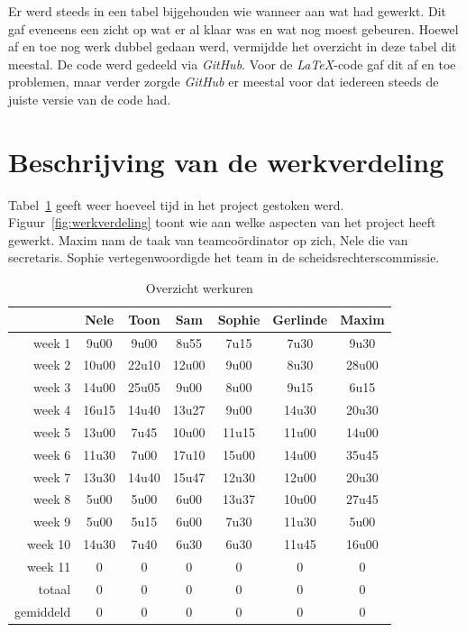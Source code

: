 \documentclass[eind]{penoverslag}
\begin{document}
Er werd steeds in een tabel bijgehouden wie wanneer aan wat had gewerkt. Dit gaf eveneens een zicht op wat er al klaar was en wat nog moest gebeuren. Hoewel af en toe nog werk dubbel gedaan werd, vermijdde het overzicht in deze tabel dit meestal.
De code werd gedeeld via \textit{GitHub}. Voor de \textit{LaTeX}-code gaf dit af en toe problemen, maar verder zorgde \textit{GitHub} er meestal voor dat iedereen steeds de juiste versie van de code had.


\section{Beschrijving van de werkverdeling}
\label{Asec:werkverdeling}
Tabel~\ref{tab:werkuren} geeft weer hoeveel tijd in het project gestoken werd. Figuur~\ref{fig:werkverdeling} toont wie aan welke aspecten van het project heeft gewerkt.
Maxim nam de taak van teamco\"ordinator op zich, Nele die van secretaris. Sophie vertegenwoordigde het team in de scheidsrechterscommissie.

\begin{table}[h]
\begin{center}
    \begin{tabular}{ r | c  c  c  c  c  c}
     & Nele & Toon & Sam & Sophie & Gerlinde & Maxim \\ \hline
    week 1 & 9u00 & 9u00 & 8u55 & 7u15 & 7u30 & 9u30\\
   	week 2 & 10u00 & 22u10 & 12u00 & 9u00 & 8u30 & 28u00\\
	week 3 & 14u00 & 25u05 & 9u00 & 8u00 & 9u15 & 6u15\\
	week 4 & 16u15 & 14u40 & 13u27 & 9u00 & 14u30 & 20u30\\
	week 5 & 13u00 & 7u45 & 10u00 & 11u15 & 11u00 & 14u00\\
	week 6 & 11u30 & 7u00 & 17u10 & 15u00 & 14u00 & 35u45\\
	week 7 & 13u30 & 14u40 & 15u47 & 12u30 & 12u00 & 20u30\\
	week 8 & 5u00 & 5u00 & 6u00 & 13u37 & 10u00 & 27u45\\
	week 9 & 5u00 & 5u15 & 6u00 & 7u30 & 11u30 & 5u00\\
	week 10 & 14u30 & 7u40 & 6u30 & 6u30 & 11u45 & 16u00\\
	week 11 & 0 & 0 & 0 & 0 & 0 & 0\\ \hline
	totaal & 0 & 0 & 0 & 0 & 0 & 0 \\
	gemiddeld & 0 & 0 & 0 & 0 & 0 & 0
    \end{tabular}
    \caption{Overzicht werkuren}
    \label{tab:werkuren}
\end{center}
\end{table}
\end{document}
